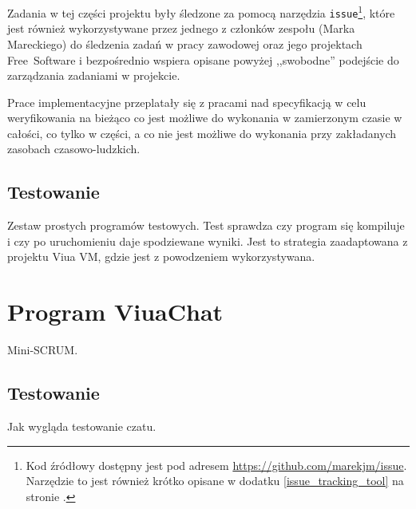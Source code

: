 Zadania w tej części projektu były śledzone za pomocą narzędzia
\texttt{issue}\footnote{Kod źródłowy dostępny jest pod adresem
\url{https://github.com/marekjm/issue}. Narzędzie to jest również krótko opisane
w dodatku \ref{issue_tracking_tool} na stronie \pageref{issue_tracking_tool}.},
które jest również wykorzystywane przez jednego z członków zespołu (Marka
Mareckiego) do śledzenia zadań w pracy zawodowej oraz jego projektach
Free~Software i bezpośrednio wspiera opisane powyżej ,,swobodne'' podejście do
zarządzania zadaniami w projekcie.

Prace implementacyjne przeplatały się z pracami nad specyfikacją w celu
weryfikowania na bieżąco co jest możliwe do wykonania w zamierzonym czasie w
całości, co tylko w części, a co nie jest możliwe do wykonania przy zakładanych
zasobach czasowo-ludzkich.

\subsection{Testowanie}

Zestaw prostych programów testowych. Test sprawdza czy program się kompiluje i czy po uruchomieniu daje
spodziewane wyniki. Jest to strategia zaadaptowana z projektu Viua VM, gdzie jest z powodzeniem
wykorzystywana.

\section{Program ViuaChat}

Mini-SCRUM.

\subsection{Testowanie}

Jak wygląda testowanie czatu.
